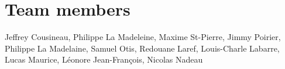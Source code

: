 \documentclass[runningheads,a4paper]{llncs}
\begin{document}

	

\section*{Team members}
Jeffrey Cousineau, Philippe La Madeleine, Maxime St-Pierre, Jimmy Poirier, Philippe La Madelaine, Samuel Otis, Redouane Laref, Louis-Charle Labarre, Lucas Maurice, Léonore Jean-François, Nicolas Nadeau 

\nocite{*}


\end{document}
